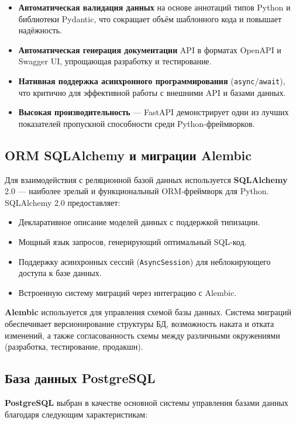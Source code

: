 \begin{itemize}
    \item \textbf{Автоматическая валидация данных} на основе аннотаций типов Python и библиотеки Pydantic, что сокращает объём шаблонного кода и повышает надёжность.
    \item \textbf{Автоматическая генерация документации} API в форматах OpenAPI и Swagger UI, упрощающая разработку и тестирование.
    \item \textbf{Нативная поддержка асинхронного программирования} (\texttt{async}/\texttt{await}), что критично для эффективной работы с внешними API и базами данных.
    \item \textbf{Высокая производительность} --- FastAPI демонстрирует одни из лучших показателей пропускной способности среди Python-фреймворков.
\end{itemize}

\subsection{ORM SQLAlchemy и миграции Alembic}

Для взаимодействия с реляционной базой данных используется \textbf{SQLAlchemy} 2.0 \cite{sqlalchemy2024} --- наиболее зрелый и функциональный ORM-фреймворк для Python. SQLAlchemy 2.0 предоставляет:

\begin{itemize}
    \item Декларативное описание моделей данных с поддержкой типизации.
    \item Мощный язык запросов, генерирующий оптимальный SQL-код.
    \item Поддержку асинхронных сессий (\texttt{AsyncSession}) для неблокирующего доступа к базе данных.
    \item Встроенную систему миграций через интеграцию с Alembic.
\end{itemize}

\textbf{Alembic} используется для управления схемой базы данных. Система миграций обеспечивает версионирование структуры БД, возможность наката и отката изменений, а также согласованность схемы между различными окружениями (разработка, тестирование, продакшн).

\subsection{База данных PostgreSQL}

\textbf{PostgreSQL} \cite{postgresql2024} выбран в качестве основной системы управления базами данных благодаря следующим характеристикам:

